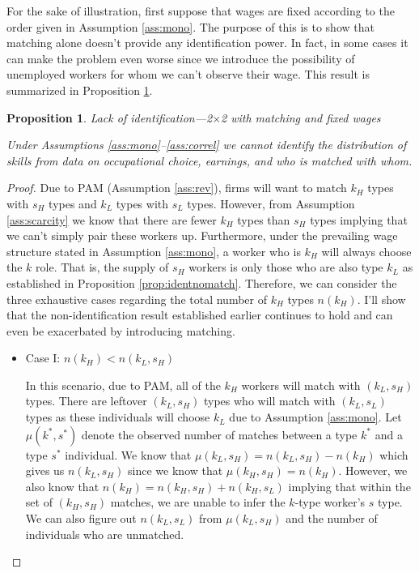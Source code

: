 \documentclass[12 pt]{article}
\newtheorem{proposition}{Proposition} %
\begin{document}
For the sake of illustration, first suppose that wages are fixed according to the order given in Assumption \ref{ass:mono}. The purpose of this is to show that matching alone doesn't provide any identification power. In fact, in some cases it can make the problem even worse since we introduce the possibility of unemployed workers for whom we can't observe their wage. This result is summarized in Proposition \ref{prop:noidentmatch}.
\begin{proposition}{Lack of identification---2$\times$2 with matching and fixed wages}
	
	Under Assumptions \ref{ass:mono}--\ref{ass:correl} we cannot identify the distribution of skills from data on occupational choice, earnings, and who is matched with whom. 
	\label{prop:noidentmatch}
\end{proposition}
\begin{proof}
	Due to PAM (Assumption \ref{ass:rev}), firms will want to match $k_H$ types with $s_H$ types and $k_L$ types with $s_L$ types. However, from Assumption \ref{ass:scarcity} we know that there are fewer $k_H$ types than $s_H$ types implying that we can't simply pair these workers up. Furthermore, under the prevailing wage structure stated in Assumption \ref{ass:mono}, a worker who is $k_H$ will always choose the $k$ role. That is, the supply of $s_H$ workers is only those who are also type $k_L$ as established in Proposition \ref{prop:identnomatch}. Therefore, we can consider the three exhaustive cases regarding the total number of $k_H$ types $n(k_H)$. I'll show that the non-identification result established earlier continues to hold and can even be exacerbated by introducing matching. 
	\begin{itemize}
		\item Case I: $n(k_H) < n(k_L,s_H)$
		
		In this scenario, due to PAM, all of the $k_H$ workers will match with $(k_L,s_H)$ types. There are leftover $(k_L,s_H)$ types who will match with $(k_L,s_L)$ types as these individuals will choose $k_L$ due to Assumption \ref{ass:mono}. Let $\mu(k^*,s^*)$ denote the observed number of matches between a type $k^*$ and a type $s^*$ individual. We know that $\mu(k_L,s_H) = n(k_L,s_H)-n(k_H)$ which gives us $n(k_L,s_H)$ since we know that $\mu(k_H,s_H) = n(k_H)$. However, we also know that $n(k_H) = n(k_H,s_H) + n(k_H,s_L)$ implying that within the set of $(k_H,s_H)$ matches, we are unable to infer the $k$-type worker's $s$ type. We can also figure out $n(k_L,s_L)$ from $\mu(k_L,s_H)$ and the number of individuals who are unmatched. 
		

\end{itemize}
\end{proof}
\end{document}
